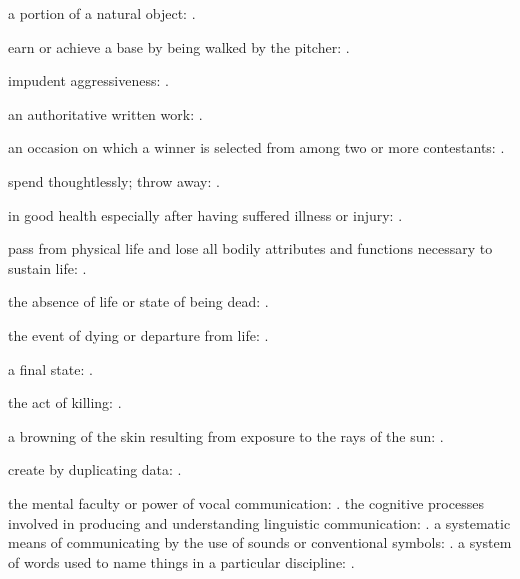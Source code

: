   a portion of a natural object:   .

  earn or achieve a base by being walked by the pitcher:   .

  impudent aggressiveness:   .

  an authoritative written work: .

  an occasion on which a winner is selected from among two or more contestants:   .

  spend thoughtlessly; throw away:   .

  in good health especially after having suffered illness or injury: .

  pass from physical life and lose all bodily attributes and functions necessary to sustain life:   .

  the absence of life or state of being dead: .

  the event of dying or departure from life:   .

  a final state:   .

  the act of killing: .

  a browning of the skin resulting from exposure to the rays of the sun:   .

  create by duplicating data:   .

  the mental faculty or power of vocal communication:   . the cognitive processes involved in producing and understanding linguistic communication:   . a systematic means of communicating by the use of sounds or conventional symbols:   . a system of words used to name things in a particular discipline:   .

